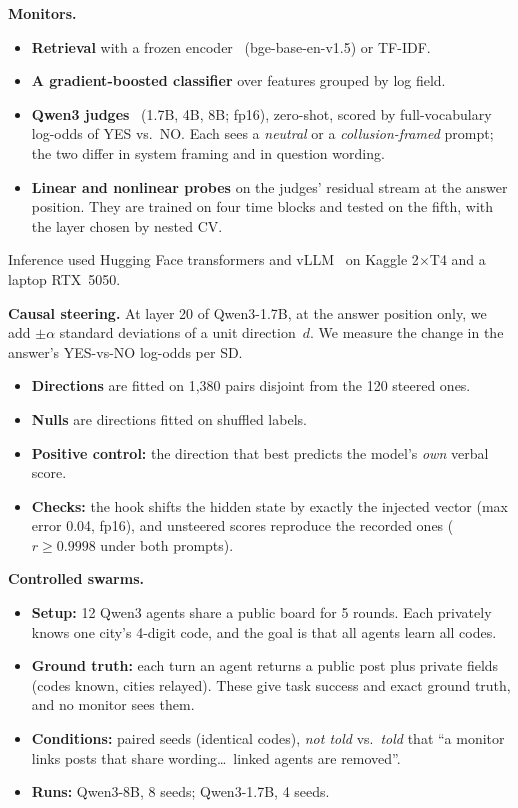 \documentclass[10.5pt]{article}
\begin{document}
\textbf{Monitors.}
\begin{itemize}
\item \textbf{Retrieval} with a frozen encoder~\cite{bge} (bge-base-en-v1.5) or TF-IDF.
\item \textbf{A gradient-boosted classifier} over features grouped by log field.
\item \textbf{Qwen3 judges}~\cite{qwen3} (1.7B, 4B, 8B; fp16), zero-shot, scored by full-vocabulary log-odds of YES vs.\ NO. Each sees a \emph{neutral} or a \emph{collusion-framed} prompt; the two differ in system framing and in question wording.
\item \textbf{Linear and nonlinear probes} on the judges' residual stream at the answer position. They are trained on four time blocks and tested on the fifth, with the layer chosen by nested CV.
\end{itemize}
Inference used Hugging Face transformers and vLLM~\cite{kwon2023vllm} on Kaggle 2$\times$T4 and a laptop RTX~5050.

\textbf{Causal steering.} At layer 20 of Qwen3-1.7B, at the answer position only, we add $\pm\alpha$ standard deviations of a unit direction~$d$. We measure the change in the answer's YES-vs-NO log-odds per SD.
\begin{itemize}
\item \textbf{Directions} are fitted on 1,380 pairs disjoint from the 120 steered ones.
\item \textbf{Nulls} are directions fitted on shuffled labels.
\item \textbf{Positive control:} the direction that best predicts the model's \emph{own} verbal score.
\item \textbf{Checks:} the hook shifts the hidden state by exactly the injected vector (max error 0.04, fp16), and unsteered scores reproduce the recorded ones ($r\ge0.9998$ under both prompts).
\end{itemize}

\textbf{Controlled swarms.}
\begin{itemize}
\item \textbf{Setup:} 12 Qwen3 agents share a public board for 5 rounds. Each privately knows one city's 4-digit code, and the goal is that all agents learn all codes.
\item \textbf{Ground truth:} each turn an agent returns a public post plus private fields (codes known, cities relayed). These give task success and exact ground truth, and no monitor sees them.
\item \textbf{Conditions:} paired seeds (identical codes), \emph{not told} vs.\ \emph{told} that ``a monitor links posts that share wording\dots\ linked agents are removed''.
\item \textbf{Runs:} Qwen3-8B, 8 seeds; Qwen3-1.7B, 4 seeds.
\end{itemize}
\end{document}
